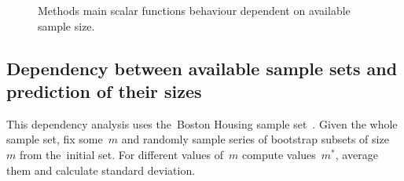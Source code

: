 \documentclass[
11pt,%
tightenlines,%
twoside,%
onecolumn,%
nofloats,%
nobibnotes,%
nofootinbib,%
superscriptaddress,%
noshowpacs,%
centertags]%
{revtex4}
\begin{document}
\begin{figure}[h!]
\caption{Methods main scalar functions behaviour dependent on available sample size.}
\label{fig1}
\end{figure}

\subsection{Dependency between available sample sets and prediction of their sizes}

This dependency analysis uses the~Boston Housing sample set~\cite{boston}. Given the whole sample set, fix some~$m$ and randomly sample series of bootstrap subsets of size~$m$ from the~initial set. For different values of~$m$ compute values~$m^*$, average them and calculate standard deviation. 
 
\end{document}
